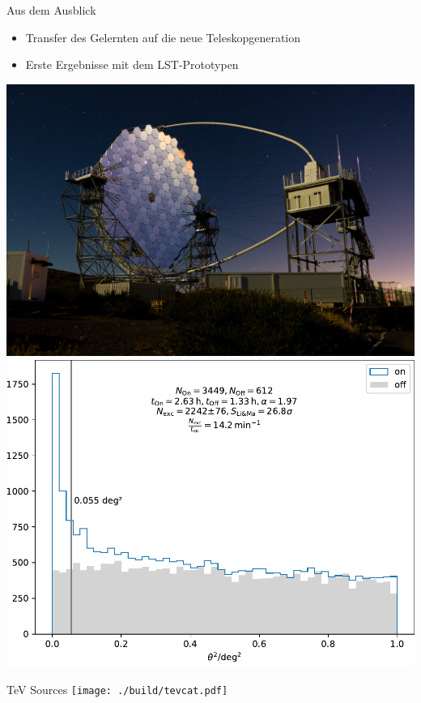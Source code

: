 \documentclass[aspectratio=1610, 9pt]{beamer}
\begin{document}
\begin{frame}[t]{Aus dem Ausblick}
  \begin{itemize}
    \item Transfer des Gelernten auf die neue Teleskopgeneration
    \item Erste Ergebnisse mit dem LST-Prototypen
  \end{itemize}
  \includegraphics[height=0.5\textheight]{images/lst.jpg}\hfill\includegraphics[height=0.65\textheight]{images/theta2_lst.pdf}%
\end{frame}


\begin{frame}[c]{TeV Sources}
  \centering
  \texttt{[image: ./build/tevcat.pdf]}
\end{frame}
\end{document}
